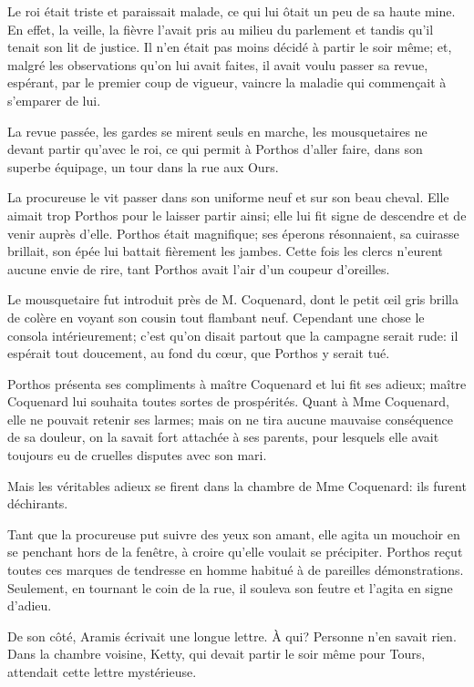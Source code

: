 Le roi était triste et paraissait malade, ce qui lui ôtait un peu de sa haute mine. En effet, la veille, la fièvre l'avait pris au milieu du parlement et tandis qu'il tenait son lit de justice. Il n'en était pas moins décidé à partir le soir même; et, malgré les observations qu'on lui avait faites, il avait voulu passer sa revue, espérant, par le premier coup de vigueur, vaincre la maladie qui commençait à s'emparer de lui. 

La revue passée, les gardes se mirent seuls en marche, les mousquetaires ne devant partir qu'avec le roi, ce qui permit à Porthos d'aller faire, dans son superbe équipage, un tour dans la rue aux Ours. 

La procureuse le vit passer dans son uniforme neuf et sur son beau cheval. Elle aimait trop Porthos pour le laisser partir ainsi; elle lui fit signe de descendre et de venir auprès d'elle. Porthos était magnifique; ses éperons résonnaient, sa cuirasse brillait, son épée lui battait fièrement les jambes. Cette fois les clercs n'eurent aucune envie de rire, tant Porthos avait l'air d'un coupeur d'oreilles. 

Le mousquetaire fut introduit près de M. Coquenard, dont le petit œil gris brilla de colère en voyant son cousin tout flambant neuf. Cependant une chose le consola intérieurement; c'est qu'on disait partout que la campagne serait rude: il espérait tout doucement, au fond du cœur, que Porthos y serait tué. 

Porthos présenta ses compliments à maître Coquenard et lui fit ses adieux; maître Coquenard lui souhaita toutes sortes de prospérités. Quant à Mme Coquenard, elle ne pouvait retenir ses larmes; mais on ne tira aucune mauvaise conséquence de sa douleur, on la savait fort attachée à ses parents, pour lesquels elle avait toujours eu de cruelles disputes avec son mari. 

Mais les véritables adieux se firent dans la chambre de Mme Coquenard: ils furent déchirants. 

Tant que la procureuse put suivre des yeux son amant, elle agita un mouchoir en se penchant hors de la fenêtre, à croire qu'elle voulait se précipiter. Porthos reçut toutes ces marques de tendresse en homme habitué à de pareilles démonstrations. Seulement, en tournant le coin de la rue, il souleva son feutre et l'agita en signe d'adieu. 

De son côté, Aramis écrivait une longue lettre. À qui? Personne n'en savait rien. Dans la chambre voisine, Ketty, qui devait partir le soir même pour Tours, attendait cette lettre mystérieuse. 

